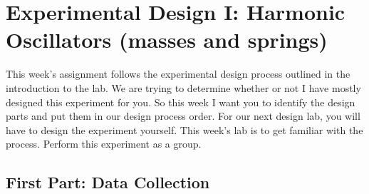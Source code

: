 \documentclass[twoside,11pt,ShortChapTitles]{BYUTextbook}
\begin{document}
\chapter[Experimental Design I]{Experimental Design I: Harmonic Oscillators (masses and springs)\label{Experimental Design}}


This week's assignment follows the experimental design process outlined in the introduction to the lab.  We are trying to determine whether or not
I have mostly designed this experiment for you. So this week I want you to
identify the design parts and put them in our design process order. For our
next design lab, you will have to design the experiment yourself. This week's
lab is to get familiar with the process. Perform this experiment as a group.

\section{First Part: Data Collection}
\end{document}
